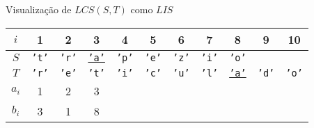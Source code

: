 \begin{frame}[fragile]{Visualização de $LCS(S, T)$ como $LIS$}

    \begin{table}
        \centering

        \begin{tabular}{c|cccccccccc} 
        \hline 
        $i$ & 1 & 2 & 3 & 4 & 5 & 6 & 7 & 8 & 9 & 10\\
        \hline
        $S$
        & {\textcolor{blue!80!black}{\texttt{'t'}}}
        & {\textcolor{blue!80!black}{\texttt{'r'}}}
        & \underline{\textcolor{blue!80!black}{\texttt{'a'}}}
        & \textcolor{blue!80!black}{\texttt{'p'}}
        & \textcolor{blue!80!black}{\texttt{'e'}}
        & \textcolor{blue!80!black}{\texttt{'z'}}
        & \textcolor{blue!80!black}{\texttt{'i'}}
        & \textcolor{blue!80!black}{\texttt{'o'}} \\
        $T$
        & {\textcolor{green!50!black}{\texttt{'r'}}}
        & \textcolor{green!50!black}{\texttt{'e'}}
        & \textcolor{green!50!black}{\texttt{'t'}}
        & \textcolor{green!50!black}{\texttt{'i'}}
        & \textcolor{green!50!black}{\texttt{'c'}}
        & \textcolor{green!50!black}{\texttt{'u'}}
        & \textcolor{green!50!black}{\texttt{'l'}}
        & \underline{\textcolor{green!50!black}{\texttt{'a'}}}
        & \textcolor{green!50!black}{\texttt{'d'}}
        & \textcolor{green!50!black}{\texttt{'o'}} \\
        $a_i$ & 1 & 2 & 3\\
        $b_i$ & 3 & 1 & 8\\
        \hline
        \end{tabular}

    \end{table}

\end{frame}

